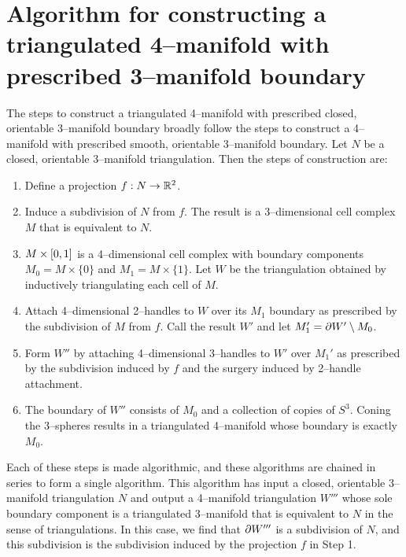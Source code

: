 \chapter[Triangulated]{Algorithm for constructing a triangulated 4--manifold with prescribed 3--manifold boundary}
\label{chapter:triangulation}

The steps to construct a triangulated 4--manifold with prescribed closed, orientable 3--manifold boundary broadly follow the steps to construct a 4--manifold with prescribed smooth, orientable 3--manifold boundary.
Let $N$ be a closed, orientable 3--manifold triangulation.
Then the steps of construction are:
\begin{enumerate}
	\item Define a projection $f:N\to\mathbb{R}^2$.
	
	\item Induce a subdivision of $N$ from $f$.  The result is a 3--dimensional cell complex $M$ that is equivalent to $N$.

	\item $M\times[0,1]$ is a 4--dimensional cell complex with boundary components $M_0 = M\times\{0\}$ and $M_1 = M\times\{1\}$.  Let $W$ be the triangulation obtained by inductively triangulating each cell of $M$.
	
	\item Attach 4--dimensional 2--handles to $W$ over its $M_1$ boundary as prescribed by the subdivision of $M$ from $f$.  Call the result $W'$ and let $M_1'=\partial W' \setminus M_0$.
	
	\item Form $W''$ by attaching 4--dimensional 3--handles to $W'$ over $M_1'$ as prescribed by the subdivision induced by $f$ and the surgery induced by 2--handle attachment.
	
	\item The boundary of $W''$ consists of $M_0$ and a collection of copies of $S^3$. Coning the 3--spheres results in a triangulated 4--manifold whose boundary is exactly $M_0$.
\end{enumerate}

Each of these steps is made algorithmic, and these algorithms are chained in series to form a single algorithm.
This algorithm has input a closed, orientable 3--manifold triangulation $N$ and output a 4--manifold triangulation $W'''$ whose sole boundary component is a triangulated 3--manifold that is equivalent to $N$ in the sense of triangulations.
In this case, we find that $\partial W'''$ is a subdivision of $N$, and this subdivision is the subdivision induced by the projection $f$ in Step 1.


